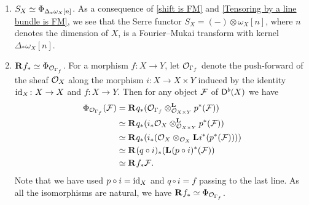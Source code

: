 \begin{example}
\begin{enumerate}[label = (\roman*)]
{    } \label{Tensoring by a line bundle is FM}
    \item{$S_X \iso \fm{\Delta_*\omega_X[n]}$. As a consequence of \ref{shift is FM} and \ref{Tensoring by a line bundle is FM}, we see that the Serre functor $S_X = (-) \otimes \omega_X[n]$, where $n$ denotes the dimension of $X$, is a Fourier--Mukai transform with kernel $\Delta_*\omega_X[n]$. 
    }
    \item{$\rderived{}{f_*} \iso \fm{\struct{\Gamma_f}}$. For a morphism $f \colon X \to Y$, let $\struct{\Gamma_f}$ denote the push-forward of the sheaf $\struct{X}$ along the morphism $i\colon X \to X \times Y$ induced by the identity $\id{X}\colon X \to X$ and $f\colon X \to Y$.  Then for any object $\F$ of $\derb{X}$ we have
    \begin{align*}
        \fm{\struct{\Gamma_f}}(\F) &= \rderived{}{q_*}(\derivedtensor{\struct{\Gamma_f}}{p^*(\F)}{\struct{X \times Y}}) \\
        &\iso \rderived{}{q_*}(\derivedtensor{i_*\struct{X}}{{p^*}(\F)}{\struct{X \times Y}}) \\
        &\iso \rderived{}{q_*}(i_*(\struct{X} \otimes_{\struct{X}}\lderived{}{i^*}({p^*}(\F)))) \\
        &\iso \rderived{}{(q \circ i)_*}(\lderived{}{(p \circ i)^*}(\F)) \\
        &\iso \rderived{}{f_*}\F.
    \end{align*}
    Note that we have used $p \circ i = \id{X}$ and $q \circ i = f$ passing to the last line. As all the isomorphisms are natural, we have $\rderived{}{f_*} \iso \fm{\struct{\Gamma_f}}$.
    }
\end{enumerate}
\end{example}

